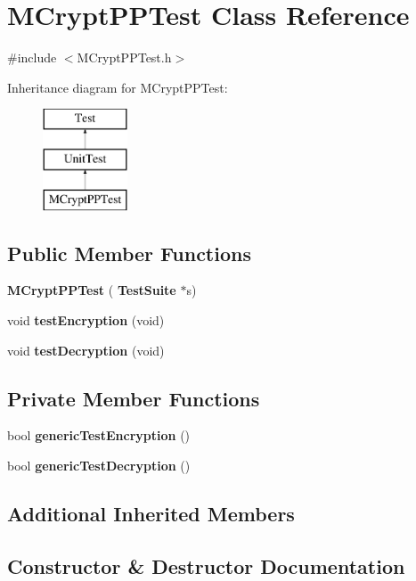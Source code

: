 \section{M\+Crypt\+P\+P\+Test Class Reference}
\label{classMCryptPPTest}


{\ttfamily \#include $<$M\+Crypt\+P\+P\+Test.\+h$>$}

Inheritance diagram for M\+Crypt\+P\+P\+Test\+:\begin{figure}[H]
\begin{center}
\leavevmode
\includegraphics[height=3.000000cm]{classMCryptPPTest}
\end{center}
\end{figure}
\subsection*{Public Member Functions}
\begin{DoxyCompactItemize}
\item 
\textbf{ M\+Crypt\+P\+P\+Test} (\textbf{ Test\+Suite} $\ast$s)
\item 
void \textbf{ test\+Encryption} (void)
\item 
void \textbf{ test\+Decryption} (void)
\end{DoxyCompactItemize}
\subsection*{Private Member Functions}
\begin{DoxyCompactItemize}
\item 
bool \textbf{ generic\+Test\+Encryption} ()
\item 
bool \textbf{ generic\+Test\+Decryption} ()
\end{DoxyCompactItemize}
\subsection*{Additional Inherited Members}


\subsection{Constructor \& Destructor Documentation}
\mbox{\label{classMCryptPPTest_afe3dab17b61491ef222fac71386ad48e}} 
